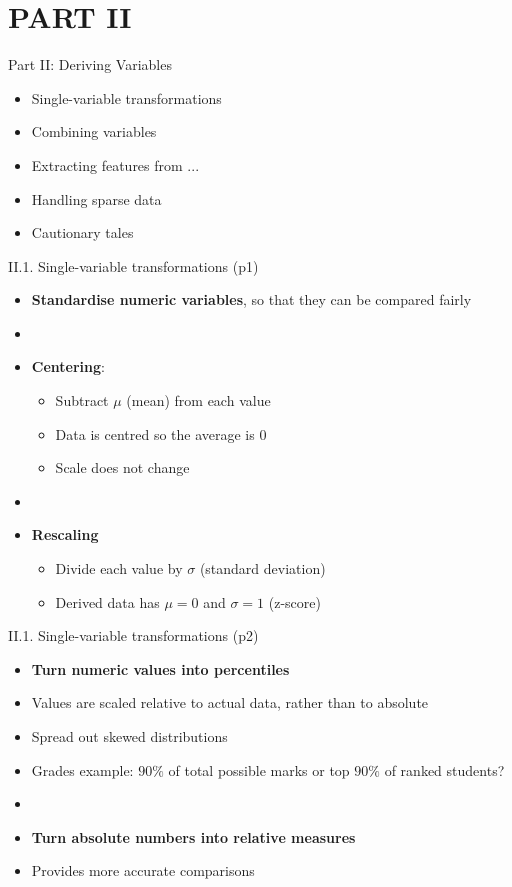 \documentclass[handout]{beamer}
\newcommand{\strong}[1]{\textbf{\color{teal} #1}}
\newcommand{\stronger}[1]{\textbf{\color{purple} #1}}
\begin{document}
\section{PART II}
\begin{frame}{Part II: Deriving Variables}
\begin{itemize}
\item[II.1.] Single-variable transformations
\item[II.2.] Combining variables
\item[II.3.] Extracting features from ...
\item[II.4.] Handling sparse data
\item[II.5.] Cautionary tales
\end{itemize}
\end{frame}
\begin{frame}{II.1. Single-variable transformations (p1)}
\begin{itemize}
\item[] \strong{Standardise numeric variables}, so that they can be compared fairly
\item[]
\item \stronger{Centering}: 
	\begin{itemize}
	\item Subtract $\mu$ (mean) from each value
	\item Data is centred so the average is $0$
	\item Scale does not change
	\end{itemize}
\item[]
\item \stronger{Rescaling}
	\begin{itemize}
	\item Divide each value by $\sigma$ (standard deviation)
	\item Derived data has $\mu=0$ and $\sigma=1$ (z-score)
	\end{itemize}
\end{itemize}
\end{frame}
\begin{frame}{II.1. Single-variable transformations (p2)}
\begin{itemize}
\item[] \strong{Turn numeric values into percentiles}
\item Values are scaled relative to actual data, rather than to absolute
\item Spread out skewed distributions
\item Grades example: $90\%$ of total possible marks or top $90\%$ of ranked students?
\item[]
\item[] \strong{Turn absolute numbers into relative measures}
\item Provides more accurate comparisons
\end{itemize}
\end{frame}
\end{document}
